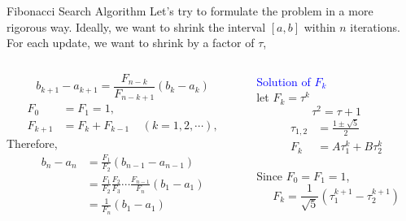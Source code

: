 \documentclass{beamer}
\begin{document}
\begin{frame}{Fibonacci Search Algorithm}
Let's try to formulate the problem in a more rigorous way. 
Ideally, we want to shrink the interval $[a, b]$ within $n$ iterations. For each update, we want to shrink by a factor of $\tau$,
\begin{columns}

\begin{column}{0.6 \textwidth}
\begin{equation*}
   b_{k+1} - a_{k+1} = \frac{F_{n-k}}{F_{n-k+1}}(b_k - a_k)
\end{equation*}
\begin{equation*}
\begin{split}
    F_0 &= F_1 = 1,\\
    F_{k+1} &= F_k + F_{k-1}~~~~~(k=1, 2, \cdots),     
\end{split}
\end{equation*}
Therefore,
\begin{equation*}
\begin{split}
    b_n - a_n &= \frac{F_1}{F_2}(b_{n-1}- a_{n-1})\\
              &= \frac{F_1}{F_2}\frac{F_2}{F_3} \cdots \frac{F_{n-1}}{F_n} (b_1-a_1)\\
              &= \frac{1}{F_n}(b_1 - a_1)
\end{split}
\end{equation*}
\end{column}

\begin{column}{0.4 \textwidth}
\centering
\textcolor{blue}{Solution of $F_k$}\\
let $F_k = \tau^k$
\begin{equation*}
    \tau^2 = \tau + 1
\end{equation*}
\begin{equation*}
\begin{split}
    \tau_{1,2} &= \frac{1\pm \sqrt{5}}{2}\\
    F_k & = A\tau_1^k + B\tau_2^k
\end{split}
\end{equation*}

Since $F_0 = F_1 = 1$, 
\begin{equation*}
    F_k = \frac{1}{\sqrt{5}} (\tau_1^{k+1} - \tau_2^{k+1})
\end{equation*}
\end{column}

\end{columns}

\end{frame}
\end{document}
